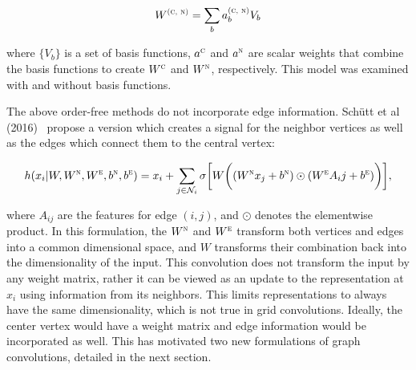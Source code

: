 \begin{equation}
W^\textsc{(c, n)} = \sum_{b} a^\textsc{(c, n)}_b V_b 
\label{eq:rgcn_basis}
\end{equation}

\noindent
where $\{V_b\}$ is a set of basis functions, $a^\textsc{c}$ and $a^\textsc{n}$ are scalar weights that combine the basis functions to create $W^\textsc{c}$ and $W^\textsc{n}$, respectively.
This model was examined with and without basis functions.

The above order-free methods do not incorporate edge information.
Sch{\"u}tt et al (2016)~\cite{schutt2017} propose a version which creates a signal for the neighbor vertices as well as the edges which connect them to the central vertex:

\begin{equation}
h(x_i | W, W^\textsc{n}, W^\textsc{e}, b^\textsc{n}, b^\textsc{e})= x_i + \sum_{j \in \mathcal{N}_i} \sigma \bigg[ W \bigg( (W^\textsc{n} x_j + b^\textsc{n}) \odot (W^\textsc{e} A_ij + b^\textsc{e}) \bigg) \bigg],
\label{eq:deep_tensor}
\end{equation}

\noindent
where $A_{ij}$ are the features for edge $(i, j)$, and $\odot$ denotes the elementwise product.
In this formulation, the $W^\textsc{n}$ and $W^\textsc{e}$ transform both vertices and edges into a common dimensional space, and $W$ transforms their combination back into the dimensionality of the input. 
This convolution does not transform the input by any weight matrix, rather it can be viewed as an update to the representation at $x_i$ using information from its neighbors.
This limits representations to always have the same dimensionality, which is not true in grid convolutions. 
Ideally, the center vertex would have a weight matrix and edge information would be incorporated as well.
This has motivated two new formulations of graph convolutions, detailed in the next section.


